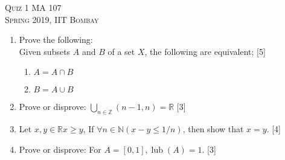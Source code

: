 \documentclass{article}
\begin{document}
\begin{center}
    \textsc{Quiz 1 MA 107}\\
    \textsc{Spring 2019, IIT Bombay}
\end{center}
\begin{enumerate}[label = (\arabic*)]
    \item Prove the following:\\
    Given subsets $A$ and $B$ of a set $X$, the following are equivalent; \hfill [5]
    \begin{enumerate}[label = (\roman*), nosep]
        \item $A = A\cap B$
        \item $B = A \cup B$
    \end{enumerate}
    \item Prove or disprove: $\bigcup_{n\in\mathbb{Z}}(n-1, n) = \mathbb{R}$ \hfill [3]
    \item Let $x, y \in \mathbb{R} x \ge y$, If $\forall n \in \mathbb{N}(x - y \le 1/n)$, then show that $x = y$. \hfill [4]
    \item Prove or disprove: For $A = [0, 1], \operatorname{lub}(A) = 1$. \hfill [3]
\end{enumerate}
\end{document}
